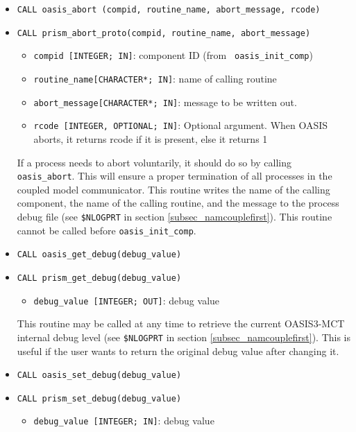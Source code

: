 \begin{itemize}
\item {\tt CALL oasis\_abort (compid, routine\_name, abort\_message, rcode)}
\item {\tt CALL prism\_abort\_proto(compid, routine\_name,
    abort\_message)}
  \begin{itemize}
  \item {\tt compid [INTEGER; IN]}: component ID (from {\tt
      oasis\_init\_comp})
  \item {\tt routine\_name[CHARACTER*; IN]}: name of calling routine
  \item {\tt abort\_message[CHARACTER*; IN]}: message to be written
    out.
  \item {\tt rcode [INTEGER, OPTIONAL; IN]}: Optional argument. When OASIS 
    aborts, it returns rcode if it is present, else it returns 1
  \end{itemize}

  If a process needs to abort voluntarily, it should do so by calling
  {\tt oasis\_abort}. This will ensure a proper termination of all
  processes in the coupled model communicator. This routine writes the
  name of the calling component, the name of the calling routine, and the
  message to the process debug file (see {\tt \$NLOGPRT} in section
  \ref{subsec_namcouplefirst}).  This routine cannot be called before
  {\tt oasis\_init\_comp}.

  \vspace{0.2cm}
\item {\tt CALL oasis\_get\_debug(debug\_value)}
\item {\tt CALL prism\_get\_debug(debug\_value)}
  \begin{itemize}
  \item {\tt debug\_value [INTEGER; OUT]}: debug value
  \end{itemize}

  This routine may be called at any time to retrieve the current
  OASIS3-MCT internal debug level (see {\tt \$NLOGPRT} in section
  \ref{subsec_namcouplefirst}).  This is useful if the user wants to
  return the original debug value after changing it.

  \vspace{0.2cm}
\item {\tt CALL oasis\_set\_debug(debug\_value)}
\item {\tt CALL prism\_set\_debug(debug\_value)}
  \begin{itemize}
  \item {\tt debug\_value [INTEGER; IN]}: debug value
  \end{itemize}


\end{itemize}
